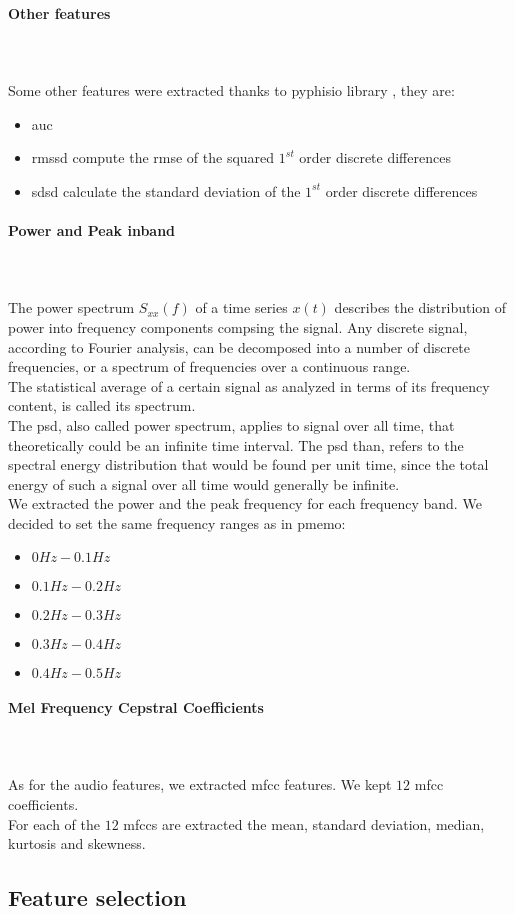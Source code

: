 \paragraph{Other features}
\mbox{} \\ \\
Some other features were extracted thanks to pyphisio library \cite{bizzego2019pyphysio}, they are:
\begin{itemize}
	\item \gls{auc}
	\item \gls{rmssd} compute the \gls{rmse} of the squared $1^{st}$ order discrete differences
	\item \gls{sdsd} calculate the standard deviation of the $1^{st}$ order discrete differences
\end{itemize}

\paragraph{Power and Peak inband}
\mbox{} \\ \\
The power spectrum $S_{xx}(f)$ of a time series $x(t)$ describes the distribution of power into frequency components compsing the signal. Any discrete signal, according to Fourier analysis, can be decomposed into a number of discrete frequencies, or a spectrum of frequencies over a continuous range.
\\
The statistical average of a certain signal as analyzed in terms of its frequency content, is called its spectrum.
\\ \indent
The \gls{psd}, also called power spectrum, applies to signal over all time, that theoretically could be an infinite time interval. The \gls{psd} than, refers to the spectral energy distribution that would be found per unit time, since the total energy of such a signal over all time would generally be infinite.
\\
We extracted the power and the peak frequency for each frequency band. We decided to set the same frequency ranges as in \gls{pmemo}:
\begin{itemize}
	\item $0Hz-0.1Hz$
	\item $0.1Hz-0.2Hz$
	\item $0.2Hz-0.3Hz$
	\item $0.3Hz-0.4Hz$
	\item $0.4Hz-0.5Hz$
\end{itemize}

\paragraph{Mel Frequency Cepstral Coefficients}
\mbox{} \\ \\
As for the audio features, we extracted \gls{mfcc} features. We kept $12$ \gls{mfcc} coefficients.
\\
For each of the $12$ \gls{mfcc}s are extracted the mean, standard deviation, median, kurtosis and skewness.

\subsection{Feature selection}